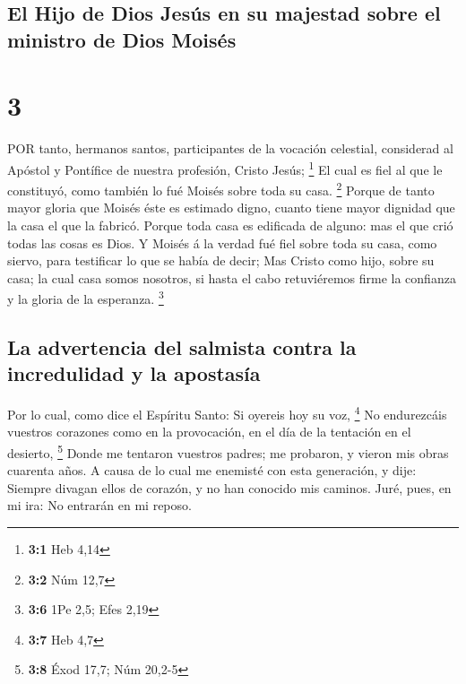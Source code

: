 \hypertarget{el-hijo-de-dios-jesuxfas-en-su-majestad-sobre-el-ministro-de-dios-moisuxe9s}{%
\subsection{El Hijo de Dios Jesús en su majestad sobre el ministro de
Dios
Moisés}\label{el-hijo-de-dios-jesuxfas-en-su-majestad-sobre-el-ministro-de-dios-moisuxe9s}}

\hypertarget{section-2}{%
\section{3}\label{section-2}}

 POR tanto, hermanos santos, participantes de la vocación
celestial, considerad al Apóstol y Pontífice de nuestra profesión,
Cristo Jesús; \footnote{\textbf{3:1} Heb 4,14}  El cual es
fiel al que le constituyó, como también lo fué Moisés sobre toda su
casa. \footnote{\textbf{3:2} Núm 12,7}  Porque de tanto
mayor gloria que Moisés éste es estimado digno, cuanto tiene mayor
dignidad que la casa el que la fabricó.  Porque toda casa es
edificada de alguno: mas el que crió todas las cosas es Dios.
 Y Moisés á la verdad fué fiel sobre toda su casa, como
siervo, para testificar lo que se había de decir;  Mas
Cristo como hijo, sobre su casa; la cual casa somos nosotros, si hasta
el cabo retuviéremos firme la confianza y la gloria de la esperanza.
\footnote{\textbf{3:6} 1Pe 2,5; Efes 2,19}

\hypertarget{la-advertencia-del-salmista-contra-la-incredulidad-y-la-apostasuxeda}{%
\subsection{La advertencia del salmista contra la incredulidad y la
apostasía}\label{la-advertencia-del-salmista-contra-la-incredulidad-y-la-apostasuxeda}}

 Por lo cual, como dice el Espíritu Santo: Si oyereis hoy su
voz, \footnote{\textbf{3:7} Heb 4,7}  No endurezcáis
vuestros corazones como en la provocación, en el día de la tentación en
el desierto, \footnote{\textbf{3:8} Éxod 17,7; Núm 20,2-5} 
Donde me tentaron vuestros padres; me probaron, y vieron mis obras
cuarenta años.  A causa de lo cual me enemisté con esta
generación, y dije: Siempre divagan ellos de corazón, y no han conocido
mis caminos.  Juré, pues, en mi ira: No entrarán en mi
reposo.

